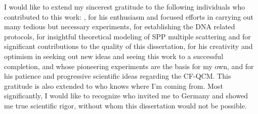I would like to extend my sincerest gratitude to the following individuals who
contributed to this work: , for his enthusiasm and focused
efforts in carrying out many tedious but necessary experiments,
 for establishing the DNA related protocols,
 for insightful theoretical modeling of SPP multiple
scattering and for significant contributions to the quality of this
dissertation,  for his creativity and optimism in seeking
out new ideas and seeing this work to a successful completion,
 and  whose pioneering
experiments are the basis for my own, and  for his patience and
progressive scientific ideas regarding the CF-QCM. This gratitude is also
extended to  who knows where I'm coming from.  Most
significantly, I would like to recognize  who invited me
to Germany and showed me true scientific rigor, without whom this dissertation
would not be possible.
